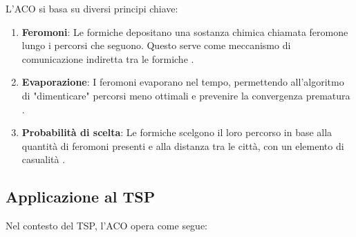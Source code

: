 L'\gls{ACO} si basa su diversi principi chiave:

\begin{enumerate}
	\item \textbf{Feromoni}: Le formiche depositano una sostanza chimica chiamata feromone lungo i percorsi che seguono. Questo serve come meccanismo di comunicazione indiretta tra le formiche \cite{dorigo2006ant}.
	\item \textbf{Evaporazione}: I feromoni evaporano nel tempo, permettendo all'algoritmo di "dimenticare" percorsi meno ottimali e prevenire la convergenza prematura \cite{stutzle2000max}.
	\item \textbf{Probabilità di scelta}: Le formiche scelgono il loro percorso in base alla quantità di feromoni presenti e alla distanza tra le città, con un elemento di casualità \cite{dorigo2004ant}.
\end{enumerate}

\subsection{Applicazione al \gls{TSP}}

Nel contesto del \gls{TSP}, l'ACO opera come segue:

